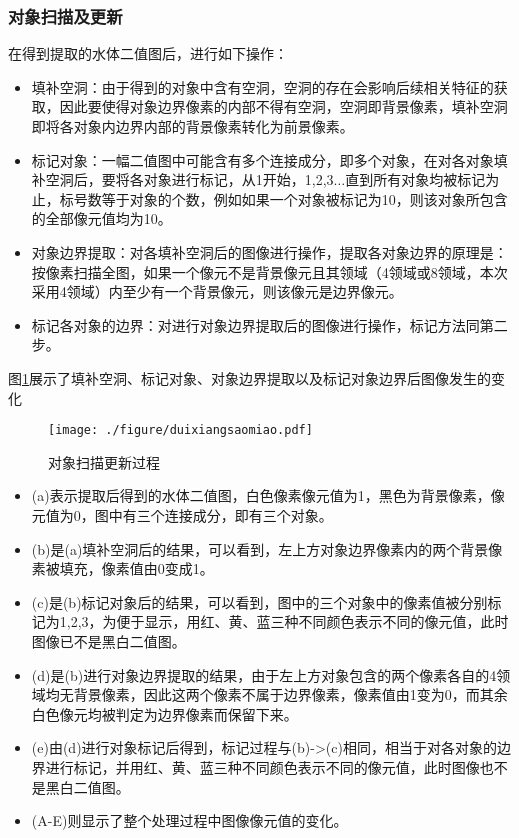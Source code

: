 \documentclass[supercite]{upcthesis}
\begin{document}
\subsubsection{对象扫描及更新}
在得到提取的水体二值图后，进行如下操作：
\begin{itemize}
\item 填补空洞：由于得到的对象中含有空洞，空洞的存在会影响后续相关特征的获取，因此要使得对象边界像素的内部不得有空洞，空洞即背景像素，填补空洞即将各对象内边界内部的背景像素转化为前景像素。
\item 标记对象：一幅二值图中可能含有多个连接成分，即多个对象，在对各对象填补空洞后，要将各对象进行标记，从1开始，1,2,3$\dots$直到所有对象均被标记为止，标号数等于对象的个数，例如如果一个对象被标记为10，则该对象所包含的全部像元值均为10。
\item 对象边界提取：对各填补空洞后的图像进行操作，提取各对象边界的原理是：按像素扫描全图，如果一个像元不是背景像元且其领域（4领域或8领域，本次采用4领域）内至少有一个背景像元，则该像元是边界像元。
\item 标记各对象的边界：对进行对象边界提取后的图像进行操作，标记方法同第二步。
\end{itemize}

图\ref{duixiangsaomiao}展示了填补空洞、标记对象、对象边界提取以及标记对象边界后图像发生的变化

\begin{figure}[htbp]
	\centering
	\texttt{[image: ./figure/duixiangsaomiao.pdf]}
	\caption{对象扫描更新过程}
	\label{duixiangsaomiao}
\end{figure}
\begin{itemize}
\item(a)表示提取后得到的水体二值图，白色像素像元值为1，黑色为背景像素，像元值为0，图中有三个连接成分，即有三个对象。
\item(b)是(a)填补空洞后的结果，可以看到，左上方对象边界像素内的两个背景像素被填充，像素值由0变成1。
\item(c)是(b)标记对象后的结果，可以看到，图中的三个对象中的像素值被分别标记为1,2,3，为便于显示，用红、黄、蓝三种不同颜色表示不同的像元值，此时图像已不是黑白二值图。
\item(d)是(b)进行对象边界提取的结果，由于左上方对象包含的两个像素各自的4领域均无背景像素，因此这两个像素不属于边界像素，像素值由1变为0，而其余白色像元均被判定为边界像素而保留下来。
\item(e)由(d)进行对象标记后得到，标记过程与(b)->(c)相同，相当于对各对象的边界进行标记，并用红、黄、蓝三种不同颜色表示不同的像元值，此时图像也不是黑白二值图。
\item(A-E)则显示了整个处理过程中图像像元值的变化。
\end{itemize}
\end{document}
